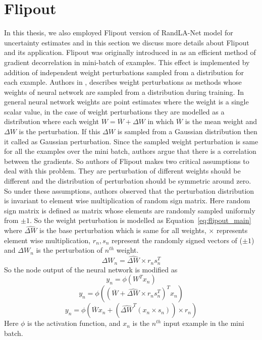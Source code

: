 \section{Flipout}
\label{sec:meth_flipout}
In this thesis, we also employed Flipout version of RandLA-Net model for uncertainty estimates and in this section we discuss more details about Flipout and its application.
Flipout was originally introduced in \cite{Flipout} as an efficient method of gradient decorrelation in mini-batch of examples.
This effect is implemented by addition of independent weight perturbations sampled from a distribution for each example.
Authors in \cite{Flipout}, describes weight perturbations as methods whose weights of neural network are sampled from a distribution during training.
In general neural network weights are point estimates where the weight is a single scalar value, in the case of weight perturbations they are modelled as a distribution where each weight $W=\overline{W}+\Delta W$ in which $\overline{W}$ is the mean weight and $\Delta W$ is the perturbation.
If this $\Delta W$ is sampled from a Gaussian distribution then it called as Gaussian perturbation.
Since the sampled weight perturbation is same for all the examples over the mini batch, authors argue that there is a correlation between the gradients.
So authors of Flipout makes two critical assumptions to deal with this problem. 
They are perturbation of different weights should be different and the distribution of perturbation should be symmetric around zero.
So under these assumptions, authors observed that the perturbation distribution is invariant to element wise multiplication of random sign matrix.
Here random sign matrix is defined as matrix whose elements are randomly sampled uniformly from $\pm 1$. 
So the weight perturbation is modelled as Equation~\ref{eq:flipout_main} where $\widehat{\Delta W}$ is the base perturbation which is same for all weights, $\times$ represents element wise multiplication, $r_n, s_n$ represent the randomly signed vectors of ($\pm 1$) and $\Delta W_n$ is the perturbation of $n^{th}$ weight.
\begin{equation}
    \Delta W_n = \widehat{\Delta W} \times r_n s_{n}^T
    \label{eq:flipout_main}
\end{equation}
So the node output of the neural network is modified as 
$$y_n = \phi(W^T x_n) $$
$$y_n = \phi((\overline{W}+\widehat{\Delta W} \times r_n s_{n}^T)^Tx_n)$$
$$y_n = \phi(\overline{W} x_n+(\widehat{\Delta W}^T (x_n\times s_{n}))\times r_n)$$
Here $\phi$ is the activation function, and $x_n$ is the $n^{th}$ input example in the mini batch.
